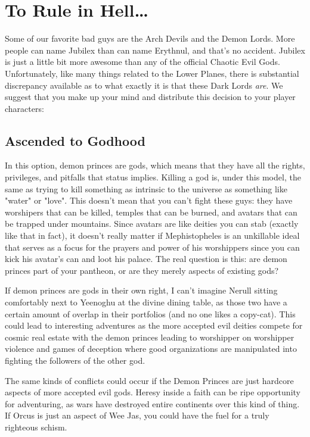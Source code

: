 \section{To Rule in Hell\ldots}

Some of our favorite bad guys are the Arch Devils and the Demon Lords. More people can name Jubilex than can name Erythnul, and that's no accident. Jubilex is just a little bit more awesome than any of the official Chaotic Evil Gods. Unfortunately, like many things related to the Lower Planes, there is substantial discrepancy available as to what exactly it is that these Dark Lords \textit{are}. We suggest that you make up your mind and distribute this decision to your player characters:

\subsection{Ascended to Godhood}

In this option, demon princes are gods, which means that they have all the rights, privileges, and pitfalls that status implies. Killing a god is, under this model, the same as trying to kill something as intrinsic to the universe as something like "water" or "love". This doesn't mean that you can't fight these guys: they have worshipers that can be killed, temples that can be burned, and avatars that can be trapped under mountains. Since avatars are like deities you can stab (exactly like that in fact), it doesn't really matter if Mephistopheles is an unkillable ideal that serves as a focus for the prayers and power of his worshippers since you can kick his avatar's can and loot his palace. The real question is this: are demon princes part of your pantheon, or are they merely aspects of existing gods?

If demon princes are gods in their own right, I can't imagine Nerull sitting comfortably next to Yeenoghu at the divine dining table, as those two have a certain amount of overlap in their portfolios (and no one likes a copy-cat). This could lead to interesting adventures as the more accepted evil deities compete for cosmic real estate with the demon princes leading to worshipper on worshipper violence and games of deception where good organizations are manipulated into fighting the followers of the other god.

The same kinds of conflicts could occur if the Demon Princes are just hardcore aspects of more accepted evil gods. Heresy inside a faith can be ripe opportunity for adventuring, as wars have destroyed entire continents over this kind of thing. If Orcus is just an aspect of Wee Jas, you could have the fuel for a truly righteous schism.

